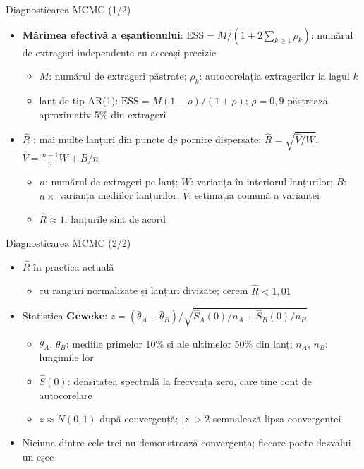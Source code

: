 \begin{frame}{Diagnosticarea MCMC (1/2)}
\itemsize{\small}
\begin{itemize}
    \item \textbf{Mărimea efectivă a eșantionului}: $\mathrm{ESS} = M/(1 + 2\sum_{k\ge1}\rho_k)$: numărul de extrageri independente cu aceeași precizie
    \begin{itemize}
        \item $M$: numărul de extrageri păstrate; $\rho_k$: autocorelația extragerilor la lagul $k$
        \item lanț de tip AR(1): $\mathrm{ESS} = M(1 - \rho)/(1 + \rho)$; $\rho = 0{,}9$ păstrează aproximativ 5\% din extrageri
    \end{itemize}
    \item \textbf{$\widehat R$} : mai multe lanțuri din puncte de pornire dispersate; $\widehat R = \sqrt{\hat V/W}$, $\hat V = \frac{n-1}{n}W + B/n$
    \begin{itemize}
        \item $n$: numărul de extrageri pe lanț; $W$: varianța în interiorul lanțurilor; $B$: $n\times$ varianța mediilor lanțurilor; $\hat V$: estimația comună a varianței
        \item $\widehat R \approx 1$: lanțurile sînt de acord
    \end{itemize}
\end{itemize}
\end{frame}

\begin{frame}{Diagnosticarea MCMC (2/2)}
\itemsize{\small}
\begin{itemize}
    \item $\widehat R$ în practica actuală 
    \begin{itemize}
        \item cu ranguri normalizate și lanțuri divizate; cerem $\widehat R < 1{,}01$
    \end{itemize}
    \item Statistica \textbf{Geweke}: $z = (\bar\theta_A - \bar\theta_B)/\sqrt{\hat S_A(0)/n_A + \hat S_B(0)/n_B}$
    \begin{itemize}
        \item $\bar\theta_A$, $\bar\theta_B$: mediile primelor 10\% și ale ultimelor 50\% din lanț; $n_A$, $n_B$: lungimile lor
        \item $\hat S(0)$: densitatea spectrală la frecvența zero, care ține cont de autocorelare
        \item $z \approx N(0, 1)$ după convergență; $|z| > 2$ semnalează lipsa convergenței
    \end{itemize}
    \item Niciuna dintre cele trei nu demonstrează convergența; fiecare poate dezvălui un eșec
\end{itemize}
\end{frame}

